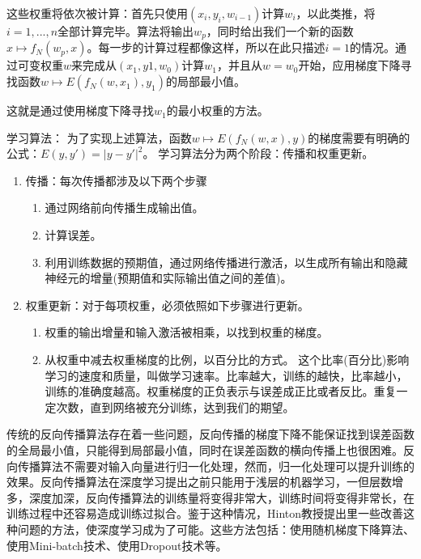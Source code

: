 这些权重将依次被计算：首先只使用$(x_i,y_i,w_{i-1})$计算$w_i$，以此类推，将$i = 1,...,n$全部计算完毕。算法将输出$w_p$，同时给出我们一个新的函数$x \mapsto f_N(w_p,x)$。每一步的计算过程都像这样，所以在此只描述$i = 1$的情况。通过可变权重$w$来完成从$(x_1,y1,w_0)$计算$w_1$，并且从$w = w_0$开始，应用梯度下降寻找函数$w \mapsto E(f_N(w,x_1),y_1)$的局部最小值。

这就是通过使用梯度下降寻找$w_1$的最小权重的方法。

学习算法：
为了实现上述算法，函数$w \mapsto E(f_N(w,x),y)$的梯度需要有明确的公式：$E(y,{y}') = \left |y - {y}'  \right |^2$。
学习算法分为两个阶段：传播和权重更新。
\begin{enumerate}
    \item 传播：每次传播都涉及以下两个步骤
    \begin{enumerate}
        \item 通过网络前向传播生成输出值。
        \item 计算误差。
        \item 利用训练数据的预期值，通过网络传播进行激活，以生成所有输出和隐藏神经元的增量(预期值和实际输出值之间的差值)。
    \end{enumerate}
    \item 权重更新：对于每项权重，必须依照如下步骤进行更新。
    \begin{enumerate}
        \item 权重的输出增量和输入激活被相乘，以找到权重的梯度。
        \item 从权重中减去权重梯度的比例，以百分比的方式。
        这个比率(百分比)影响学习的速度和质量，叫做学习速率。比率越大，训练的越快，比率越小，训练的准确度越高。权重梯度的正负表示与误差成正比或者反比。重复一定次数，直到网络被充分训练，达到我们的期望。
    \end{enumerate}
\end{enumerate}

传统的反向传播算法存在着一些问题，反向传播的梯度下降不能保证找到误差函数的全局最小值，只能得到局部最小值，同时在误差函数的横向传播上也很困难。反向传播算法不需要对输入向量进行归一化处理，然而，归一化处理可以提升训练的效果。反向传播算法在深度学习提出之前只能用于浅层的机器学习，一但层数增多，深度加深，反向传播算法的训练量将变得非常大，训练时间将变得非常长，在训练过程中还容易造成训练过拟合。鉴于这种情况，Hinton教授提出里一些改善这种问题的方法，使深度学习成为了可能。这些方法包括：使用随机梯度下降算法、使用Mini-batch技术、使用Dropout技术等。

